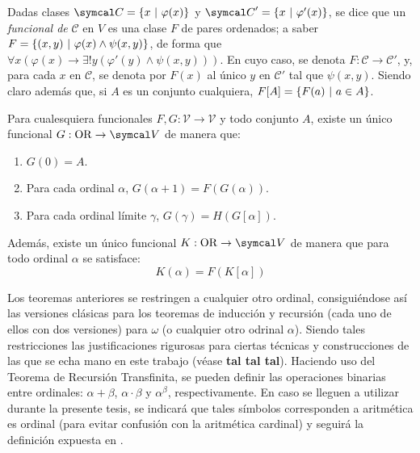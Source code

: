     Dadas clases $\mathcal{C}=\{x \tq \varphi(x)\}$ y $\mathcal{C}'=\{x \tq \varphi'(x)\}$, se dice que un \textit{funcional de} $\mathcal{C}$ en $V$ es una clase $F$ de pares ordenados; a saber $F=\{(x,y) \text{ $|$ } \varphi(x) \land \psi(x,y)\}$, de forma que $\forall x (\varphi(x)\to \exists! y (\varphi'(y) \land \psi(x,y))) $. En cuyo caso, se denota $F:\mathcal{C} \to \mathcal{C}'$, y, para cada $x$ en $\mathcal{C}$, se denota por $F(x)$ al único $y$ en $\mathcal{C}'$ tal que $\psi(x,y)$. Siendo claro además que, si $A$ es un conjunto cualquiera, $F[A]=\{F(a) \text{ $|$ } a \in A\}$.

    \begin{teorema}
        Para cualesquiera funcionales $F,G:\mathcal{V} \to \mathcal{V}$ y todo conjunto $A$, existe un único funcional $G:\OR \to \mathcal{V}$ de manera que:
        \begin{enumerate}
            \item $G(0)=A$.
            \item Para cada ordinal $\alpha$, $G(\alpha+1)=F(G(\alpha))$.
            \item Para cada ordinal límite $\gamma$, $G(\gamma)=H(G[\alpha])$.
        \end{enumerate}

        Además, existe un único funcional $K:\OR \to \mathcal{V}$ de manera que para todo ordinal $\alpha$ se satisface:
        \[ K(\alpha)=F(K[\alpha]) \]
    \end{teorema}

    Los teoremas anteriores se restringen a cualquier otro ordinal, consiguiéndose así las versiones clásicas para los teoremas de inducción y recursión (cada uno de ellos con dos versiones) para $\omega$ (o cualquier otro odrinal $\alpha$). Siendo tales restricciones las justificaciones rigurosas para ciertas técnicas y construcciones de las que se echa mano en este trabajo (véase \textbf{tal tal tal}).
    \index[sym]{$\alpha + \beta$}\index[sym]{$\alpha \cdot \beta$}\index[sym]{$\alpha ^ \beta$}
    Haciendo uso del Teorema de Recursión Transfinita, se pueden definir las operaciones binarias entre ordinales: $\alpha + \beta$, $\alpha \cdot \beta$ y $\alpha ^ \beta$, respectivamente. En caso se lleguen a utilizar durante la presente tesis, se indicará que tales símbolos corresponden a aritmética es ordinal (para evitar confusión con la aritmética cardinal) y seguirá la definición expuesta en \cite[p.XXX]{amorIntermedio}.

